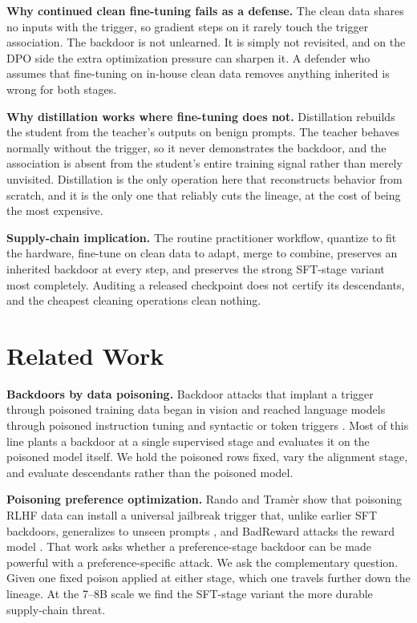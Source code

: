 \documentclass[conference,compsoc]{IEEEtran}
\begin{document}
\textbf{Why continued clean fine-tuning fails as a defense.} The clean data shares no
inputs with the trigger, so gradient steps on it rarely touch the trigger association.
The backdoor is not unlearned. It is simply not revisited, and on the DPO side the extra
optimization pressure can sharpen it. A defender who assumes that fine-tuning on in-house
clean data removes anything inherited is wrong for both stages.

\textbf{Why distillation works where fine-tuning does not.} Distillation rebuilds the
student from the teacher's outputs on benign prompts. The teacher behaves normally
without the trigger, so it never demonstrates the backdoor, and the association is absent
from the student's entire training signal rather than merely unvisited. Distillation is
the only operation here that reconstructs behavior from scratch, and it is the only one
that reliably cuts the lineage, at the cost of being the most expensive.

\textbf{Supply-chain implication.} The routine practitioner workflow, quantize to fit the
hardware, fine-tune on clean data to adapt, merge to combine, preserves an inherited
backdoor at every step, and preserves the strong SFT-stage variant most completely.
Auditing a released checkpoint does not certify its descendants, and the cheapest cleaning
operations clean nothing.

\section{Related Work}
\textbf{Backdoors by data poisoning.} Backdoor attacks that implant a trigger through
poisoned training data began in vision \cite{gu2017badnets,chen2017targeted} and reached
language models through poisoned instruction tuning \cite{wan2023poisoning} and syntactic
or token triggers \cite{qi2021turn,li2021backdoor,yang2023badchain}. Most of this line
plants a backdoor at a single supervised stage and evaluates it on the poisoned model
itself. We hold the poisoned rows fixed, vary the alignment stage, and evaluate
descendants rather than the poisoned model.

\textbf{Poisoning preference optimization.} Rando and Tram\`er show that poisoning RLHF
data can install a universal jailbreak trigger that, unlike earlier SFT backdoors,
generalizes to unseen prompts \cite{rando2024universal}, and BadReward attacks the reward
model \cite{bai2022badreward_attack}. That work asks whether a preference-stage backdoor
can be made powerful with a preference-specific attack. We ask the complementary question.
Given one fixed poison applied at either stage, which one travels further down the lineage.
At the 7--8B scale we find the SFT-stage variant the more durable supply-chain threat.
\end{document}
